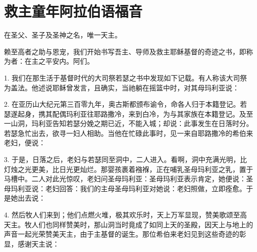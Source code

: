 
\chapter{救主童年阿拉伯语福音}


在圣父、圣子及圣神之名，唯一天主。\par

赖至高者之助与恩宠，我们开始书写吾主、导师及救主耶稣基督的奇迹之书，即称为者：在主之平安内。阿们。\par

1. 我们在那生活于基督时代的大司祭若瑟之书中发现如下记载。有人称该大司祭为盖法。他述说耶稣曾发言，且确实，当祂躺在摇篮中时，对其母玛利亚说：\par

2. 在亚历山大纪元第三百零九年，奥古斯都颁布谕令，命各人归于本籍登记。若瑟遂起身，携其配偶玛利亚往耶路撒冷，来到白冷，为与其家族在本籍登记。及至一山洞，玛利亚告知若瑟分娩之期已近，不能入城；却说：此事发生在日落时分。若瑟急忙出去，欲寻一妇人相助。当他在忙碌此事时，见一来自耶路撒冷的希伯来老妇，便说：\par

3. 于是，日落之后，老妇与若瑟同至洞中，二人进入。看啊，洞中充满光明，比灯烛之光更美，比日光更灿烂。那婴孩裹着襁褓，正在哺乳圣母玛利亚之乳，置于马槽中。二人对此光惊叹，老妇问圣母玛利亚：圣母玛利亚表示肯定，她便说：圣母玛利亚说：老妇回答：我们的主母圣母玛利亚对她说：老妇照做，立即痊愈。于是她出去说：\par

4. 然后牧人们来到；他们点燃火堆，极其欢乐时，天上万军显现，赞美歌颂至高天主。牧人们也同样赞美时，那山洞当时竟成了如同上天的圣殿，因天上与地上的声音一起光荣赞美天主，由于主基督的诞生。那位希伯来老妇见到这些奇迹的彰显，感谢天主说：\par

